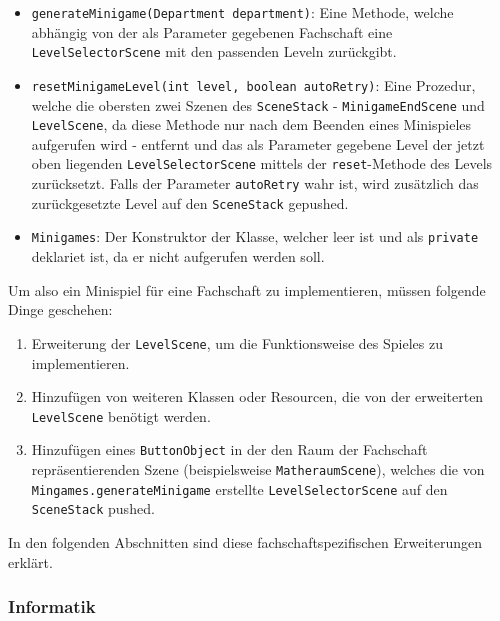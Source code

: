 \begin{sloppypar}
    \begin{itemize}
        \item \texttt{generateMinigame(Department department)}: Eine Methode, welche abhängig von der als Parameter gegebenen Fachschaft eine \texttt{LevelSelectorScene} mit den passenden Leveln zurückgibt.
        \item \texttt{resetMinigameLevel(int level, boolean autoRetry)}: Eine Prozedur, welche die obersten zwei Szenen des \texttt{SceneStack} - \texttt{MinigameEndScene} und \texttt{LevelScene}, da diese Methode nur nach dem Beenden eines Minispieles aufgerufen wird - entfernt und das als Parameter gegebene Level der jetzt oben liegenden \texttt{LevelSelectorScene} mittels der \texttt{reset}-Methode des Levels zurücksetzt.
            Falls der Parameter \texttt{autoRetry} wahr ist, wird zusätzlich das zurückgesetzte Level auf den \texttt{SceneStack} gepushed.
        \item \texttt{Minigames}: Der Konstruktor der Klasse, welcher leer ist und als \texttt{private} deklariet ist, da er nicht aufgerufen werden soll.
    \end{itemize}
\end{sloppypar}

Um also ein Minispiel für eine Fachschaft zu implementieren, müssen folgende Dinge geschehen:

\begin{sloppypar}
    \begin{enumerate}
        \item Erweiterung der \texttt{LevelScene}, um die Funktionsweise des Spieles zu implementieren.
        \item Hinzufügen von weiteren Klassen oder Resourcen, die von der erweiterten \texttt{LevelScene} benötigt werden.
        \item Hinzufügen eines \texttt{ButtonObject} in der den Raum der Fachschaft repräsentierenden Szene (beispielsweise \texttt{MatheraumScene}), welches die von \texttt{Mingames.generateMinigame} erstellte \texttt{LevelSelectorScene} auf den \texttt{SceneStack} pushed.
    \end{enumerate}
\end{sloppypar}

In den folgenden Abschnitten sind diese fachschaftspezifischen Erweiterungen erklärt.

\subsubsection{Informatik}


